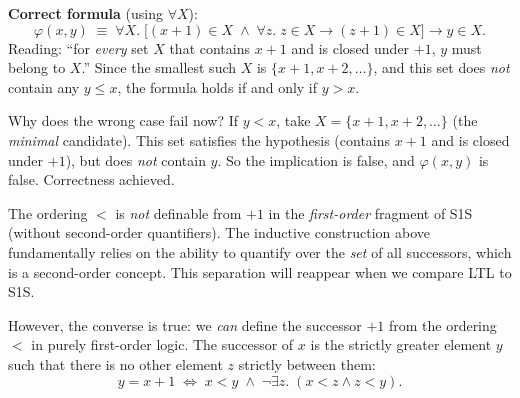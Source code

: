 \begin{example}
\begin{center}
  \label{fig:s1s-order-counterexample}
\end{center}

\medskip\noindent
\textbf{Correct formula} (using $\forall X$):
\[
  \varphi(x, y) \;\equiv\;
  \forall X.\;\bigl[(x+1) \in X \;\land\;
                \forall z.\; z \in X \to (z+1) \in X\bigr]
             \to y \in X.
\]
Reading: ``for \emph{every} set $X$ that contains $x+1$ and is closed
under $+1$, $y$ must belong to $X$.''  Since the smallest such $X$ is
$\{x+1, x+2, \ldots\}$, and this set does \emph{not} contain any
$y \leq x$, the formula holds if and only if $y > x$.

Why does the wrong case fail now?  If $y < x$, take $X = \{x+1, x+2, \ldots\}$
(the \emph{minimal} candidate).  This set satisfies the hypothesis (contains
$x+1$ and is closed under $+1$), but does \emph{not} contain $y$.  So the
implication is false, and $\varphi(x, y)$ is false.  Correctness achieved.
\end{example}

\begin{remark}
The ordering $<$ is \emph{not} definable from $+1$ in the
\emph{first-order} fragment of S1S (without second-order quantifiers).
The inductive construction above fundamentally relies on the ability to
quantify over the \emph{set} of all successors, which is a second-order
concept.  This separation will reappear when we compare LTL to S1S.

However, the converse is true: we \emph{can} define the successor $+1$ from the ordering $<$ in purely first-order logic. The successor of $x$ is the strictly greater element $y$ such that there is no other element $z$ strictly between them:
\[
  y = x+1 \;\iff\; x < y \;\land\; \neg\exists z.\; (x < z \land z < y).
\]
\end{remark}


